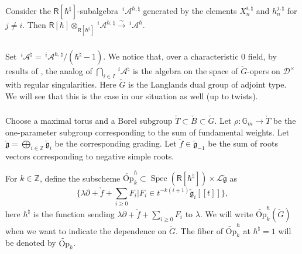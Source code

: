 \documentclass{amsart}
\theoremstyle{definition}
\newcommand{\sss}{\subsubsection{}}
\newcommand{\D}{\sD}
\newcommand{\sD}{\mathscr{D}}
\newcommand{\on}{\mathrm}
\newcommand{\Ring}{\mathsf{R}}
\newcommand{\g}{\mathfrak{g}}
\newcommand{\Z}{\mathbb{Z}}
\newcommand{\A}{\mathscr{A}}
\newcommand{\Jet}{\mathscr{J}}
\newcommand{\Loop}{\mathscr{L}}
\newcommand{\Op}{\on{Op}}
\numberwithin{equation}{section}
\begin{document}
Consider the $\Ring[\hbar^\natural]$-subalgebra $\,^i\!\A^{\hbar,\natural}$ generated by the elements $X^{i,\natural}_n$ and $h^{j,\natural}_n$ for $j\neq i$.
Then $\Ring[\hbar]\otimes_{\Ring[\hbar^\natural]}\,^i\!\A^{\hbar,\natural}\xrightarrow{\sim} \,^i\!\A^{\hbar}$. 



\sss
Set $\,^i\!\A^\natural=\,^i\!\A^{\hbar,\natural}/(\hbar^\natural-1)$.
We notice that, over a characteristic $0$ field, by results of \cite{Frenkel_loop}, the analog of $\bigcap_{i\in I}\,^i\!\A^\natural$ is the algebra on the space of $\check{G}$-opers on $\D^\times$ with regular singularities. Here $\check{G}$ is the Langlands dual group of adjoint type. We will see that this is the case in our situation as well (up to twists). 

\sss 
Choose a maximal torus and a Borel subgroup $\check{T}\subset\check{B}\subset \check{G}$.  Let $\rho:\mathbb{G}_m\rightarrow \check{T}$ be the one-parameter subgroup corresponding to the sum of fundamental weights. Let $\check{\g}=\bigoplus_{i\in \Z}\check{\g}_i$ be the corresponding grading. 
Let $\check{f}\in \check{\g}_{-1}$ be the sum of roots vectors corresponding to negative simple roots. 

For $k\in \Z$, define the subscheme $\widetilde{\Op}^\hbar_k\subset \operatorname{Spec}(\Ring[\hbar^\natural])\times \Loop \check{\g}$ as 
$$\{\lambda\partial+\check{f}+\sum_{i\geqslant 0}F_i| F_i\in t^{-k(i+1)}\check{\g}_i[[t]]\},$$
here $\hbar^\natural$ is the function sending $\lambda\partial+\check{f}+\sum_{i\geqslant 0}F_i$ to $\lambda$. We will write $\widetilde{\Op}^\hbar_k(\check{G})$ when we want to indicate the dependence on $\check{G}$. The fiber of $\widetilde{\Op}^\hbar_k$ at $\hbar^\natural=1$ will be denoted by 
$\widetilde{\Op}_k$.
\end{document}

